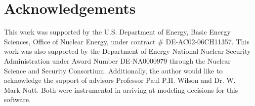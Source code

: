 \section{Acknowledgements}
This work was supported by the U.S.  Department of Energy, Basic Energy
Sciences, Office of Nuclear Energy, under contract \# DE-AC02-06CH11357.  This
work was also supported by the Department of Energy National Nuclear Security
Administration under Award Number DE‐NA0000979 through the Nuclear Science and
Security Consortium. Additionally, the author would like to acknowledge the
support of advisors Professor Paul P.H. Wilson and Dr.  W. Mark Nutt. Both were
instrumental in arriving at modeling decisions for this software.
